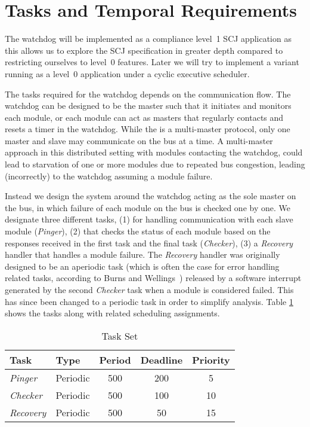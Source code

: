 \section{Tasks and Temporal Requirements}
The watchdog will be implemented as a compliance level~1 SCJ application as this allows us to explore the SCJ specification in greater depth compared to restricting ourselves to level~0 features. Later we will try to implement a variant running as a level~0 application under a cyclic executive scheduler.

The tasks required for the watchdog depends on the communication flow. The watchdog can be designed to be the master such that it initiates and monitors each module, or each module can act as masters that regularly contacts and resets a timer in the watchdog. While the \iic is a multi-master protocol, only one master and slave may communicate on the bus at a time.
A multi-master approach in this distributed setting with modules contacting the watchdog, could lead to starvation of one or more modules due to repeated bus congestion, leading (incorrectly) to the watchdog assuming a module failure.

Instead we design the system around the watchdog acting as the sole master on the bus, in which failure of each module on the bus is checked one by one. We designate three different tasks, (1) for handling \iic communication with each slave module (\textit{Pinger}), (2) that checks the status of each module based on the responses received in the first task and the final task (\textit{Checker}), (3) a \textit{Recovery} handler that handles a module failure. The \textit{Recovery} handler was originally designed to be an aperiodic task (which is often the case for error handling related tasks, according to Burns and Wellings~\cite{alan2001real}) released by a software interrupt generated by the second \textit{Checker} task when a module is considered failed. This has since been changed to a periodic task in order to simplify analysis. Table \ref{tab:taskslol} shows the tasks along with related scheduling assignments.
\begin{table}
\centering
\begin{tabular}{ | l | l | c | c | c |}
\hline
Task & Type & Period & Deadline & Priority  \\ \hline
\textit{Pinger} & Periodic & 500 & 200 & 5  \\ \hline
\textit{Checker} & Periodic & 500 & 100 & 10 \\ \hline
\textit{Recovery} & Periodic & 500 & 50 &  15 \\
\hline
\end{tabular}
 \caption{Task Set}
 \label{tab:taskslol}
\end{table}

